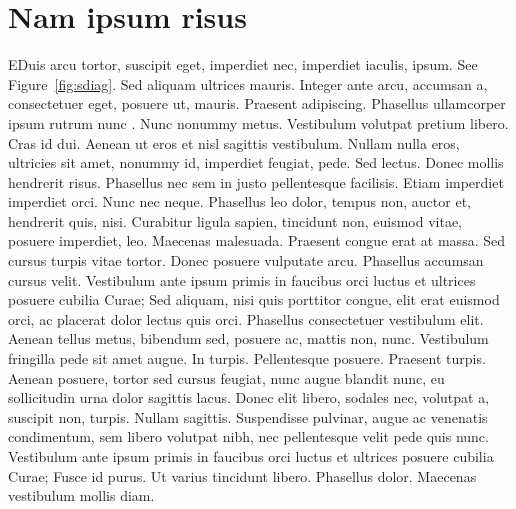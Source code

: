 \chapter{Nam ipsum risus}


\lettrine[nindent=0em,lines=3]{E} Duis arcu tortor, suscipit eget, imperdiet nec, imperdiet iaculis, ipsum. See Figure~\ref{fig:sdiag}. Sed aliquam ultrices mauris. Integer ante arcu, accumsan a, consectetuer eget, posuere ut, mauris. Praesent adipiscing. Phasellus ullamcorper ipsum rutrum nunc \cite{lamport1986latex}. Nunc nonummy metus. Vestibulum volutpat pretium libero. Cras id dui. Aenean ut eros et nisl sagittis vestibulum. Nullam nulla eros, ultricies sit amet, nonummy id, imperdiet feugiat, pede. Sed lectus. Donec mollis hendrerit risus. Phasellus nec sem in justo pellentesque facilisis. Etiam imperdiet imperdiet orci. Nunc nec neque. Phasellus leo dolor, tempus non, auctor et, hendrerit quis, nisi. Curabitur ligula sapien, tincidunt non, euismod vitae, posuere imperdiet, leo. Maecenas malesuada. Praesent congue erat at massa. Sed cursus turpis vitae tortor. Donec posuere vulputate arcu. Phasellus accumsan cursus velit. Vestibulum ante ipsum primis in faucibus orci luctus et ultrices posuere cubilia Curae; Sed aliquam, nisi quis porttitor congue, elit erat euismod orci, ac placerat dolor lectus quis orci. Phasellus consectetuer vestibulum elit. Aenean tellus metus, bibendum sed, posuere ac, mattis non, nunc. Vestibulum fringilla pede sit amet augue. In turpis. Pellentesque posuere. Praesent turpis. Aenean posuere, tortor sed cursus feugiat, nunc augue blandit nunc, eu sollicitudin urna dolor sagittis lacus. Donec elit libero, sodales nec, volutpat a, suscipit non, turpis. Nullam sagittis. Suspendisse pulvinar, augue ac venenatis condimentum, sem libero volutpat nibh, nec pellentesque velit pede quis nunc. Vestibulum ante ipsum primis in faucibus orci luctus et ultrices posuere cubilia Curae; Fusce id purus. Ut varius tincidunt libero. Phasellus dolor. Maecenas vestibulum mollis diam.

